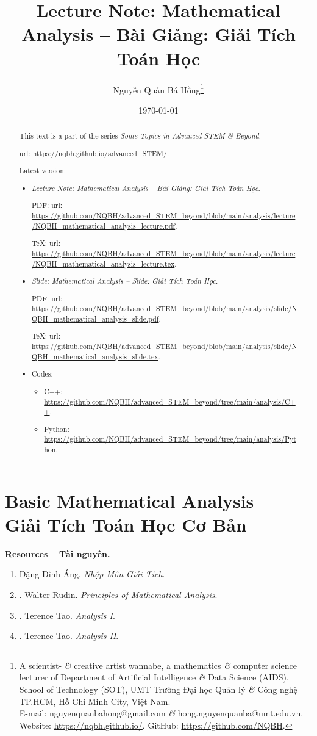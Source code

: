 \documentclass{article}
\title{Lecture Note: Mathematical Analysis -- Bài Giảng: Giải Tích Toán Học}
\author{Nguyễn Quản Bá Hồng\footnote{A scientist- {\it\&} creative artist wannabe, a mathematics {\it\&} computer science lecturer of Department of Artificial Intelligence {\it\&} Data Science (AIDS), School of Technology (SOT), UMT Trường Đại học Quản lý {\it\&} Công nghệ TP.HCM, Hồ Chí Minh City, Việt Nam.\\E-mail: {\sf nguyenquanbahong@gmail.com} {\it\&} {\sf hong.nguyenquanba@umt.edu.vn}. Website: \url{https://nqbh.github.io/}. GitHub: \url{https://github.com/NQBH}.}}
\date{\today}
\begin{document}
\maketitle
\begin{abstract}
	This text is a part of the series {\it Some Topics in Advanced STEM \& Beyond}:
	
	{\sc url}: \url{https://nqbh.github.io/advanced_STEM/}.
	
	Latest version:
	\begin{itemize}
		\item {\it Lecture Note: Mathematical Analysis -- Bài Giảng: Giải Tích Toán Học}.
		
		PDF: {\sc url}: \url{https://github.com/NQBH/advanced_STEM_beyond/blob/main/analysis/lecture/NQBH_mathematical_analysis_lecture.pdf}.
		
		\TeX: {\sc url}: \url{https://github.com/NQBH/advanced_STEM_beyond/blob/main/analysis/lecture/NQBH_mathematical_analysis_lecture.tex}.
		\item {\it Slide: Mathematical Analysis -- Slide: Giải Tích Toán Học}.
		
		PDF: {\sc url}: \url{https://github.com/NQBH/advanced_STEM_beyond/blob/main/analysis/slide/NQBH_mathematical_analysis_slide.pdf}.
		
		\TeX: {\sc url}: \url{https://github.com/NQBH/advanced_STEM_beyond/blob/main/analysis/slide/NQBH_mathematical_analysis_slide.tex}.
		\item Codes:
		\begin{itemize}
			\item C++: \url{https://github.com/NQBH/advanced_STEM_beyond/tree/main/analysis/C++}.
			\item Python: \url{https://github.com/NQBH/advanced_STEM_beyond/tree/main/analysis/Python}.
		\end{itemize}
	\end{itemize}
\end{abstract}
\tableofcontents


\section{Basic Mathematical Analysis -- Giải Tích Toán Học Cơ Bản}
\textbf{\textsf{Resources -- Tài nguyên.}}
\begin{enumerate}
	\item {\sc Đặng Đình Áng}. {\it Nhập Môn Giải Tích}.
	\item \cite{Rudin1976}. {\sc Walter Rudin}. {\it Principles of Mathematical Analysis}.
	
	\item \cite{Tao_analysis_1}. {\sc Terence Tao}. {\it Analysis I}.
	
	\item \cite{Tao_analysis_2}. {\sc Terence Tao}. {\it Analysis II}.
\end{enumerate}
\end{document}
